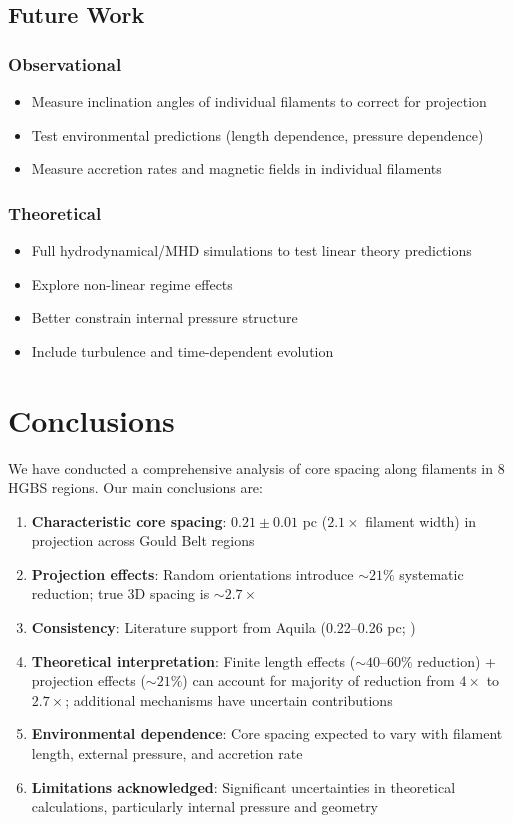 \documentclass[11pt,a4paper]{article}
\begin{document}
\subsection{Future Work}

\subsubsection{Observational}
\begin{itemize}
    \item Measure inclination angles of individual filaments to correct for projection
    \item Test environmental predictions (length dependence, pressure dependence)
    \item Measure accretion rates and magnetic fields in individual filaments
\end{itemize}

\subsubsection{Theoretical}
\begin{itemize}
    \item Full hydrodynamical/MHD simulations to test linear theory predictions
    \item Explore non-linear regime effects
    \item Better constrain internal pressure structure
    \item Include turbulence and time-dependent evolution
\end{itemize}

\section{Conclusions}

We have conducted a comprehensive analysis of core spacing along filaments in 8 HGBS regions. Our main conclusions are:

\begin{enumerate}
    \item \textbf{Characteristic core spacing}: $0.21 \pm 0.01$ pc ($2.1\times$ filament width) in projection across Gould Belt regions
    \item \textbf{Projection effects}: Random orientations introduce $\sim21\%$ systematic reduction; true 3D spacing is $\sim2.7\times$
    \item \textbf{Consistency}: Literature support from Aquila (0.22--0.26 pc; \citet{Arzoumanian2019})
    \item \textbf{Theoretical interpretation}: Finite length effects ($\sim40$--60\% reduction) + projection effects ($\sim21\%$) can account for majority of reduction from $4\times$ to $2.7\times$; additional mechanisms have uncertain contributions
    \item \textbf{Environmental dependence}: Core spacing expected to vary with filament length, external pressure, and accretion rate
    \item \textbf{Limitations acknowledged}: Significant uncertainties in theoretical calculations, particularly internal pressure and geometry
\end{enumerate}
\end{document}
